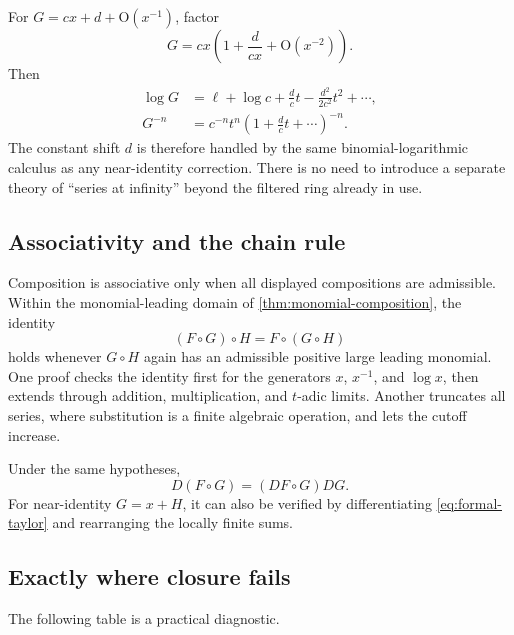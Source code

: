 \documentclass[11pt,oneside]{article}
\numberwithin{equation}{section}
\theoremstyle{definition}
\newcommand{\bigO}{\mathrm{O}}
\begin{document}
For \(G=cx+d+\bigO(x^{-1})\), factor
\[
  G=cx\left(1+\frac{d}{cx}+\bigO(x^{-2})\right).
\]
Then
\begin{align*}
  \log G
  &=\ell+\log c+\frac{d}{c}t-\frac{d^2}{2c^2}t^2+\cdots,\\
  G^{-n}
  &=c^{-n}t^n\left(1+\frac{d}{c}t+\cdots\right)^{-n}.
\end{align*}
The constant shift \(d\) is therefore handled by the same binomial-logarithmic
calculus as any near-identity correction.  There is no need to introduce a
separate theory of ``series at infinity'' beyond the filtered ring already in
use.

\subsection{Associativity and the chain rule}

Composition is associative only when all displayed compositions are admissible.
Within the monomial-leading domain of \cref{thm:monomial-composition}, the
identity
\begin{equation}\label{eq:composition-associativity}
  (F\circ G)\circ H=F\circ(G\circ H)
\end{equation}
holds whenever \(G\circ H\) again has an admissible positive large leading
monomial.  One proof checks the identity first for the generators \(x\),
\(x^{-1}\), and \(\log x\), then extends through addition, multiplication, and
\(t\)-adic limits.  Another truncates all series, where substitution is a finite
algebraic operation, and lets the cutoff increase.

Under the same hypotheses,
\begin{equation}\label{eq:chain-rule}
  D(F\circ G)=(DF\circ G)DG.
\end{equation}
For near-identity \(G=x+H\), it can also be verified by differentiating
\eqref{eq:formal-taylor} and rearranging the locally finite sums.

\subsection{Exactly where closure fails}

The following table is a practical diagnostic.
\end{document}
